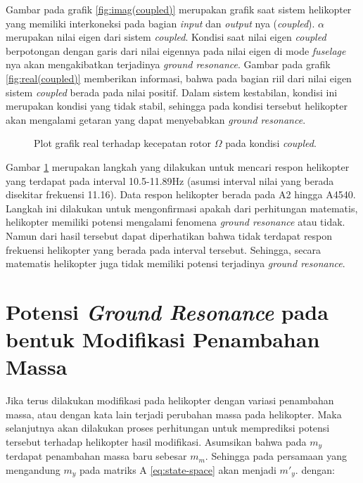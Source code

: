 Gambar pada grafik \ref{fig:imag(coupled)} merupakan grafik saat sistem helikopter yang memiliki interkoneksi pada bagian \textit{input} dan \textit{output} nya (\textit{coupled}). $\alpha$ merupakan nilai eigen dari sistem \textit{coupled}. Kondisi saat nilai eigen \textit{coupled} berpotongan dengan garis dari nilai eigennya pada nilai eigen di mode \textit{fuselage} nya akan mengakibatkan terjadinya \textit{ground resonance}. Gambar pada grafik \ref{fig:real(coupled)} memberikan informasi, bahwa pada bagian riil dari nilai eigen sistem \textit{coupled} berada pada nilai positif. Dalam sistem kestabilan, kondisi ini merupakan kondisi yang tidak stabil, sehingga pada kondisi tersebut helikopter akan mengalami getaran yang dapat menyebabkan \textit{ground resonance}. 

\begin{figure}[H]
	\centering
	\caption{Plot grafik real terhadap kecepatan rotor $\Omega$ pada kondisi \textit{coupled}.}
	\label{fig:resonance_range}
\end{figure}

Gambar \ref{fig:resonance_range} merupakan langkah yang dilakukan untuk mencari respon helikopter yang terdapat pada interval 10.5-11.89Hz (asumsi interval nilai yang berada disekitar frekuensi 11.16). Data respon helikopter berada pada A2 hingga A4540. Langkah ini dilakukan untuk mengonfirmasi apakah dari perhitungan matematis, helikopter memiliki potensi mengalami fenomena \textit{ground resonance} atau tidak. Namun dari hasil tersebut dapat diperhatikan bahwa tidak terdapat respon frekuensi helikopter yang berada pada interval tersebut. Sehingga, secara matematis helikopter juga tidak memiliki potensi terjadinya \textit{ground resonance}.

\section{Potensi \textit{Ground Resonance} pada bentuk Modifikasi Penambahan Massa}

Jika terus dilakukan modifikasi pada helikopter dengan variasi penambahan massa, atau dengan kata lain terjadi perubahan massa pada helikopter. Maka selanjutnya akan dilakukan proses perhitungan untuk memprediksi potensi tersebut terhadap helikopter hasil modifikasi. Asumsikan bahwa pada $m_y$ terdapat penambahan massa baru sebesar $m_m$. Sehingga pada persamaan yang mengandung $m_y$ pada matriks A \ref{eq:state-space} akan menjadi $m'_y$. dengan:

